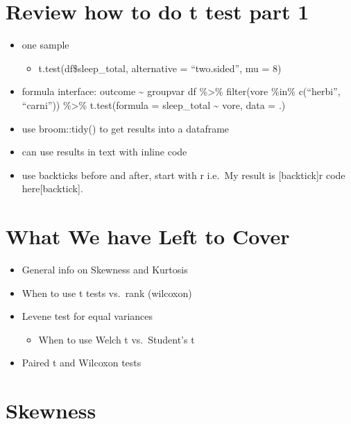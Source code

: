 \documentclass[
]{book}
\providecommand{\tightlist}{%
  \setlength{\itemsep}{0pt}\setlength{\parskip}{0pt}}
\begin{document}
\hypertarget{review-how-to-do-t-test-part-1}{%
\section{Review how to do t test part 1}\label{review-how-to-do-t-test-part-1}}

\begin{itemize}
\tightlist
\item
  one sample

  \begin{itemize}
  \tightlist
  \item
    t.test(df\$sleep\_total, alternative = ``two.sided'', mu = 8)
  \end{itemize}
\item
  formula interface: outcome \textasciitilde{} groupvar
  df \%\textgreater\% filter(vore \%in\% c(``herbi'', ``carni'')) \%\textgreater\% t.test(formula = sleep\_total \textasciitilde{} vore, data = .)
\item
  use broom::tidy() to get results into a dataframe
\item
  can use results in text with inline code
\item
  use backticks before and after, start with r
  i.e.~My result is {[}backtick{]}r code here{[}backtick{]}.
\end{itemize}

\hypertarget{what-we-have-left-to-cover}{%
\section{What We have Left to Cover}\label{what-we-have-left-to-cover}}

\begin{itemize}
\tightlist
\item
  General info on Skewness and Kurtosis
\item
  When to use t tests vs.~rank (wilcoxon)
\item
  Levene test for equal variances

  \begin{itemize}
  \tightlist
  \item
    When to use Welch t vs.~Student's t
  \end{itemize}
\item
  Paired t and Wilcoxon tests
\end{itemize}

\hypertarget{skewness}{%
\section{Skewness}\label{skewness}}
\end{document}
